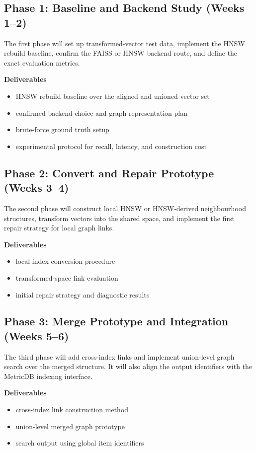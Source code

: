 \documentclass[11pt]{article}
\begin{document}
\subsection{Phase 1: Baseline and Backend Study (Weeks 1--2)}

The first phase will set up transformed-vector test data, implement the HNSW rebuild baseline, confirm the FAISS or HNSW backend route, and define the exact evaluation metrics.

\textbf{Deliverables}
\begin{itemize}
\item HNSW rebuild baseline over the aligned and unioned vector set
\item confirmed backend choice and graph-representation plan
\item brute-force ground truth setup
\item experimental protocol for recall, latency, and construction cost
\end{itemize}

\subsection{Phase 2: Convert and Repair Prototype (Weeks 3--4)}

The second phase will construct local HNSW or HNSW-derived neighbourhood structures, transform vectors into the shared space, and implement the first repair strategy for local graph links.

\textbf{Deliverables}
\begin{itemize}
\item local index conversion procedure
\item transformed-space link evaluation
\item initial repair strategy and diagnostic results
\end{itemize}

\subsection{Phase 3: Merge Prototype and Integration (Weeks 5--6)}

The third phase will add cross-index links and implement union-level graph search over the merged structure. It will also align the output identifiers with the MetricDB indexing interface.

\textbf{Deliverables}
\begin{itemize}
\item cross-index link construction method
\item union-level merged graph prototype
\item search output using global item identifiers
\end{itemize}
\end{document}
